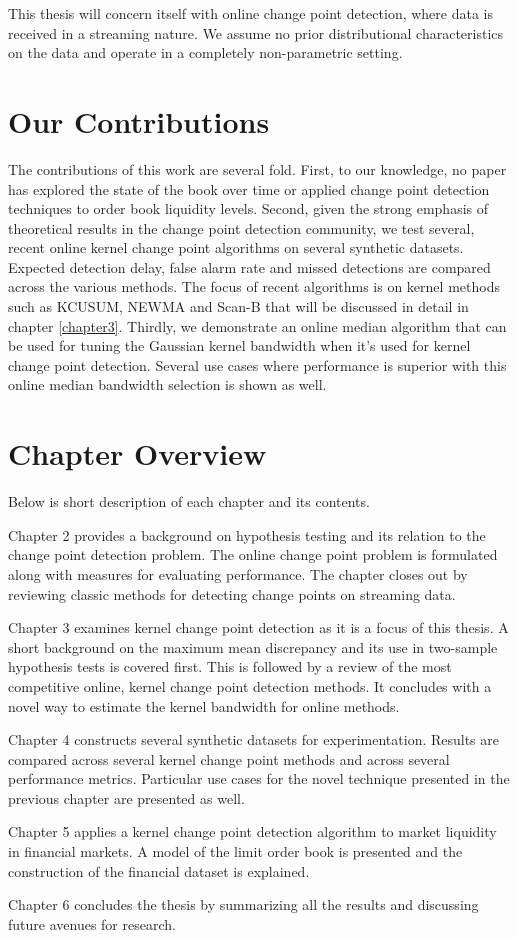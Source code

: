 This thesis will concern itself with online change point detection, where data is received in a streaming nature. We assume no prior distributional characteristics on the data and operate in a completely non-parametric setting. 


\section{Our Contributions}
The contributions of this work are several fold. First, to our knowledge, no paper has explored the state of the book over time or applied change point detection techniques to order book liquidity levels. Second, given the strong emphasis of theoretical results in the change point detection community, we test several, recent online kernel change point algorithms on several synthetic datasets. Expected detection delay, false alarm rate and missed detections are compared across the various methods. The focus of recent algorithms is on kernel methods such as KCUSUM, NEWMA and Scan-B that will be discussed in detail in chapter \ref{chapter3}. Thirdly, we demonstrate an online median algorithm that can be used for tuning the Gaussian kernel bandwidth when it's used for kernel change point detection. Several use cases where performance is superior with this online median bandwidth selection is shown as well. 

\section{Chapter Overview}
Below is short description of each chapter and its contents. %

Chapter 2 provides a background on hypothesis testing and its relation to the change point detection problem. The online change point problem is formulated along with measures for evaluating performance. The chapter closes out by reviewing classic methods for detecting change points on streaming data.

Chapter 3 examines kernel change point detection as it is a focus of this thesis. A short background on the maximum mean discrepancy and its use in two-sample hypothesis tests is covered first. This is followed by a review of the most competitive online, kernel change point detection methods. It concludes with a novel way to estimate the kernel bandwidth for online methods.

Chapter 4 constructs several synthetic datasets for experimentation. Results are compared across several kernel change point methods and across several performance metrics. Particular use cases for the novel technique presented in the previous chapter are presented as well.

Chapter 5 applies a kernel change point detection algorithm to market liquidity in financial markets. A model of the limit order book is presented and the construction of the financial dataset is explained.

Chapter 6 concludes the thesis by summarizing all the results and discussing future avenues for research.